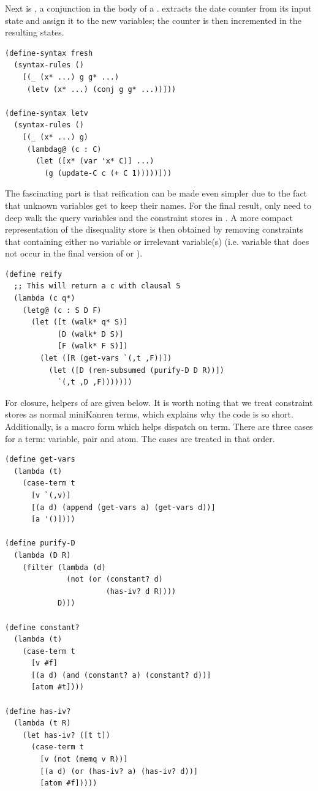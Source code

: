 Next is , a conjunction in the body of a .  extracts the date counter from its input state and assign it to the new variables; the counter is then incremented in the resulting states.
\begin{lstlisting}
(define-syntax fresh
  (syntax-rules ()
    [(_ (x* ...) g g* ...)
     (letv (x* ...) (conj g g* ...))]))

(define-syntax letv
  (syntax-rules ()
    [(_ (x* ...) g)
     (lambdag@ (c : C)
       (let ([x* (var 'x* C)] ...)
         (g (update-C c (+ C 1)))))]))
\end{lstlisting}

The fascinating part is that reification can be made even simpler due to the fact that unknown variables get to keep their names. For the final result,  only need to deep walk the query variables and the constraint stores in . A more compact representation of the disequality store is then obtained by removing constraints that containing either no variable or irrelevant variable(s) (i.e. variable that does not occur in the final version of  or ).
\begin{lstlisting}
(define reify
  ;; This will return a c with clausal S
  (lambda (c q*)
    (letg@ (c : S D F)
      (let ([t (walk* q* S)]
            [D (walk* D S)]
            [F (walk* F S)])
        (let ([R (get-vars `(,t ,F))])
          (let ([D (rem-subsumed (purify-D D R))])
            `(,t ,D ,F)))))))
\end{lstlisting}

For closure, helpers of  are given below. It is worth noting that we treat constraint stores as normal miniKanren terms, which explains why the code is so short. Additionally,  is a macro form which helps dispatch on term. There are three cases for a term: variable, pair and atom. The cases are treated in that order.
\begin{lstlisting}
(define get-vars
  (lambda (t)
    (case-term t
      [v `(,v)]
      [(a d) (append (get-vars a) (get-vars d))]
      [a '()])))

(define purify-D
  (lambda (D R)
    (filter (lambda (d)
              (not (or (constant? d)
                       (has-iv? d R))))
            D)))

(define constant?
  (lambda (t)
    (case-term t
      [v #f]
      [(a d) (and (constant? a) (constant? d))]
      [atom #t])))

(define has-iv?
  (lambda (t R)
    (let has-iv? ([t t])
      (case-term t
        [v (not (memq v R))]
        [(a d) (or (has-iv? a) (has-iv? d))]
        [atom #f]))))
\end{lstlisting}

